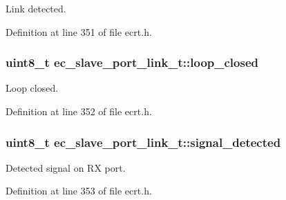 Link detected. 



Definition at line 351 of file ecrt.\-h.

\subsubsection[{loop\-\_\-closed}]{\setlength{\rightskip}{0pt plus 5cm}uint8\-\_\-t ec\-\_\-slave\-\_\-port\-\_\-link\-\_\-t\-::loop\-\_\-closed}\label{structec__slave__port__link__t_aefb5e82418479aa5f9043c9fe6503655}


Loop closed. 



Definition at line 352 of file ecrt.\-h.

\subsubsection[{signal\-\_\-detected}]{\setlength{\rightskip}{0pt plus 5cm}uint8\-\_\-t ec\-\_\-slave\-\_\-port\-\_\-link\-\_\-t\-::signal\-\_\-detected}\label{structec__slave__port__link__t_a4ee187234a71d54517327aa02f076513}


Detected signal on R\-X port. 



Definition at line 353 of file ecrt.\-h.

